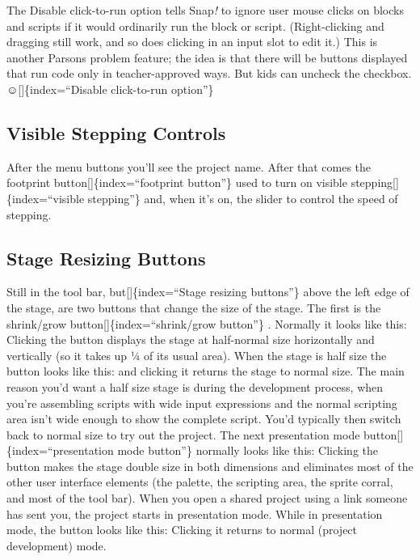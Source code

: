 \documentclass[
  letterpaper,
]{book}
\begin{document}
The Disable click-to-run option tells Snap\emph{!} to ignore user mouse
clicks on blocks and scripts if it would ordinarily run the block or
script. (Right-clicking and dragging still work, and so does clicking in
an input slot to edit it.) This is another Parsons problem feature; the
idea is that there will be buttons displayed that run code only in
teacher-approved ways. But kids can uncheck the checkbox.
☺︎{[}{]}\{index=``Disable click-to-run option''\}

\subsection{Visible Stepping Controls}\label{visible-stepping-controls}

After the menu buttons you'll see the project name. After that comes the
footprint button{[}{]}\{index=``footprint button''\} used to turn on
visible stepping{[}{]}\{index=``visible stepping''\} and, when it's on,
the slider to control the speed of stepping.

\subsection{Stage Resizing Buttons}\label{stage-resizing-buttons}

Still in the tool bar, but{[}{]}\{index=``Stage resizing buttons''\}
above the left edge of the stage, are two buttons that change the size
of the stage. The first is the shrink/grow
button{[}{]}\{index=``shrink/grow button''\} . Normally it looks like
this: Clicking the button displays the stage at half-normal size
horizontally and vertically (so it takes up ¼ of its usual area). When
the stage is half size the button looks like this: and clicking it
returns the stage to normal size. The main reason you'd want a half size
stage is during the development process, when you're assembling scripts
with wide input expressions and the normal scripting area isn't wide
enough to show the complete script. You'd typically then switch back to
normal size to try out the project. The next presentation mode
button{[}{]}\{index=``presentation mode button''\} normally looks like
this: Clicking the button makes the stage double size in both dimensions
and eliminates most of the other user interface elements (the palette,
the scripting area, the sprite corral, and most of the tool bar). When
you open a shared project using a link someone has sent you, the project
starts in presentation mode. While in presentation mode, the button
looks like this: Clicking it returns to normal (project development)
mode.
\end{document}
